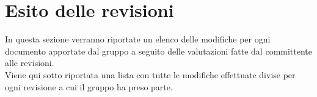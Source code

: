 %



\section{Esito delle revisioni}
\label{sub:esito_delle_revisioni}
In questa sezione verranno riportate un elenco delle modifiche per ogni documento apportate dal gruppo a seguito delle valutazioni fatte dal committente alle revisioni.\\
Viene qui sotto riportata una lista con tutte le modifiche effettuate divise per ogni revisione a cui il gruppo ha preso parte.

